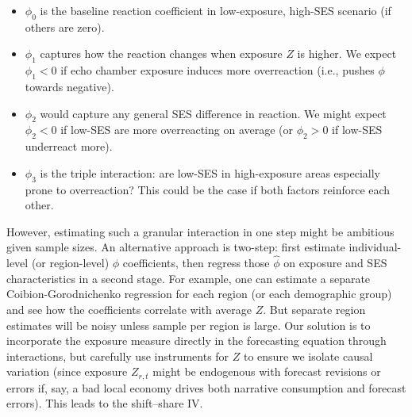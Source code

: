 \documentclass[12pt]{article}
\begin{document}
\begin{itemize}
    \item $\phi_0$ is the baseline reaction coefficient in low-exposure, high-SES scenario (if others are zero).
    \item $\phi_1$ captures how the reaction changes when exposure $Z$ is higher. We expect $\phi_1 < 0$ if echo chamber exposure induces more overreaction (i.e., pushes $\phi$ towards negative).
    \item $\phi_2$ would capture any general SES difference in reaction. We might expect $\phi_2 < 0$ if low-SES are more overreacting on average (or $\phi_2 > 0$ if low-SES underreact more).
    \item $\phi_3$ is the triple interaction: are low-SES in high-exposure areas especially prone to overreaction? This could be the case if both factors reinforce each other.
\end{itemize}
However, estimating such a granular interaction in one step might be ambitious given sample sizes. An alternative approach is two-step: first estimate individual-level (or region-level) $\phi$ coefficients, then regress those $\hat{\phi}$ on exposure and SES characteristics in a second stage. For example, one can estimate a separate Coibion-Gorodnichenko regression for each region (or each demographic group) and see how the coefficients correlate with average $Z$. But separate region estimates will be noisy unless sample per region is large.
Our solution is to incorporate the exposure measure directly in the forecasting equation through interactions, but carefully use instruments for $Z$ to ensure we isolate causal variation (since exposure $Z_{r,t}$ might be endogenous with forecast revisions or errors if, say, a bad local economy drives both narrative consumption and forecast errors). This leads to the shift–share IV.
\end{document}
